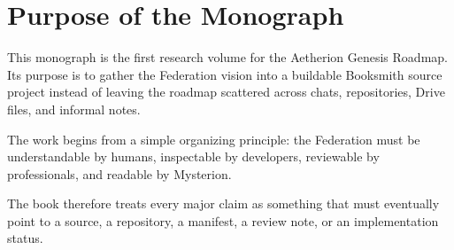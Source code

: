 \section{Purpose of the Monograph}

This monograph is the first research volume for the Aetherion Genesis Roadmap. Its purpose is to gather the Federation vision into a buildable Booksmith source project instead of leaving the roadmap scattered across chats, repositories, Drive files, and informal notes.

The work begins from a simple organizing principle: the Federation must be understandable by humans, inspectable by developers, reviewable by professionals, and readable by Mysterion.

The book therefore treats every major claim as something that must eventually point to a source, a repository, a manifest, a review note, or an implementation status.

